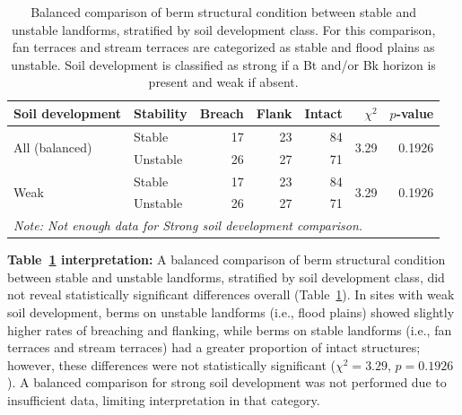 \documentclass[review]{elsarticle}
\begin{document}
\begin{table}[h!]
\centering
\caption{\normalsize Balanced comparison of berm structural condition between stable and unstable landforms, stratified by soil development class. For this comparison, fan terraces and stream terraces are categorized as stable and flood plains as unstable. Soil development is classified as strong if a Bt and/or Bk horizon is present and weak if absent.}
\small
\begin{tabular}{|l|l|r|r|r|r|r|}
\hline
\textbf{Soil development} & \textbf{Stability} & \textbf{Breach} & \textbf{Flank} & \textbf{Intact} & \textbf{$\chi^2$} & \textbf{$p$-value} \\
\hline
\multirow{2}{*}{All (balanced)} & Stable & 17 & 23 & 84 & \multirow{2}{*}{3.29} & \multirow{2}{*}{0.1926} \\
& Unstable & 26 & 27 & 71 & & \\
\hline
\multirow{2}{*}{Weak} & Stable & 17 & 23 & 84 & \multirow{2}{*}{3.29} & \multirow{2}{*}{0.1926} \\
& Unstable & 26 & 27 & 71 & & \\
\hline
\multicolumn{7}{|l|}{\textit{Note: Not enough data for Strong soil development comparison.}} \\
\hline
\end{tabular}
\label{tab:stability_soil_chi}
\end{table}

\textbf{Table~\ref{tab:stability_soil_chi} interpretation:} A balanced comparison of berm structural condition between stable and unstable landforms, stratified by soil development class, did not reveal statistically significant differences overall (Table~\ref{tab:stability_soil_chi}). In sites with weak soil development, berms on unstable landforms (i.e., flood plains) showed slightly higher rates of breaching and flanking, while berms on stable landforms (i.e., fan terraces and stream terraces) had a greater proportion of intact structures; however, these differences were not statistically significant ($\chi^2 = 3.29$, $p = 0.1926$). A balanced comparison for strong soil development was not performed due to insufficient data, limiting interpretation in that category.
\end{document}
